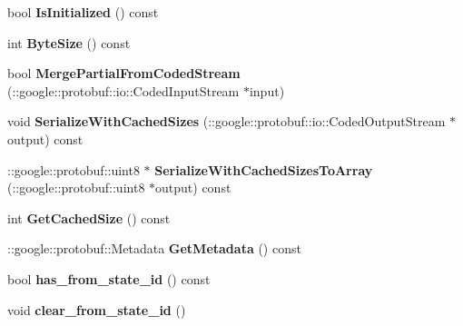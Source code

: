 \begin{DoxyCompactItemize}
\item 
\hypertarget{classgraph_1_1EdgeStatePotential_a6f9a1a9fb84714dee4bf5b4b24494ead}{
bool {\bfseries IsInitialized} () const }
\label{classgraph_1_1EdgeStatePotential_a6f9a1a9fb84714dee4bf5b4b24494ead}

\item 
\hypertarget{classgraph_1_1EdgeStatePotential_a0a60ec89c3fcf88ec83e01bcc5d89279}{
int {\bfseries ByteSize} () const }
\label{classgraph_1_1EdgeStatePotential_a0a60ec89c3fcf88ec83e01bcc5d89279}

\item 
\hypertarget{classgraph_1_1EdgeStatePotential_adfc707ab77b2d69e5ed5f4770ed3f680}{
bool {\bfseries MergePartialFromCodedStream} (::google::protobuf::io::CodedInputStream $\ast$input)}
\label{classgraph_1_1EdgeStatePotential_adfc707ab77b2d69e5ed5f4770ed3f680}

\item 
\hypertarget{classgraph_1_1EdgeStatePotential_ad02fa972c66749f49ce34430af59a2b9}{
void {\bfseries SerializeWithCachedSizes} (::google::protobuf::io::CodedOutputStream $\ast$output) const }
\label{classgraph_1_1EdgeStatePotential_ad02fa972c66749f49ce34430af59a2b9}

\item 
\hypertarget{classgraph_1_1EdgeStatePotential_ae394d1b9b82141a8b358a3adbc06c88d}{
::google::protobuf::uint8 $\ast$ {\bfseries SerializeWithCachedSizesToArray} (::google::protobuf::uint8 $\ast$output) const }
\label{classgraph_1_1EdgeStatePotential_ae394d1b9b82141a8b358a3adbc06c88d}

\item 
\hypertarget{classgraph_1_1EdgeStatePotential_acd032f41037bb2d600aead1931aba43c}{
int {\bfseries GetCachedSize} () const }
\label{classgraph_1_1EdgeStatePotential_acd032f41037bb2d600aead1931aba43c}

\item 
\hypertarget{classgraph_1_1EdgeStatePotential_aae22278c4ce7ca0e25385e9a9212d861}{
::google::protobuf::Metadata {\bfseries GetMetadata} () const }
\label{classgraph_1_1EdgeStatePotential_aae22278c4ce7ca0e25385e9a9212d861}

\item 
\hypertarget{classgraph_1_1EdgeStatePotential_a5f9ee1db6bb4e2db964624974a6c506f}{
bool {\bfseries has\_\-from\_\-state\_\-id} () const }
\label{classgraph_1_1EdgeStatePotential_a5f9ee1db6bb4e2db964624974a6c506f}

\item 
\hypertarget{classgraph_1_1EdgeStatePotential_a5a02ced96b71190c158d0fb81bf00fd5}{
void {\bfseries clear\_\-from\_\-state\_\-id} ()}
\label{classgraph_1_1EdgeStatePotential_a5a02ced96b71190c158d0fb81bf00fd5}


\end{DoxyCompactItemize}
